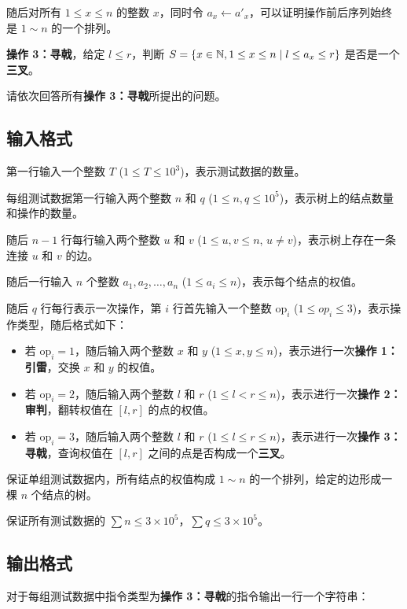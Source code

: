 随后对所有 $1 \le x \le n$ 的整数 $x$，同时令 $a_x \leftarrow a'_x$，可以证明操作前后序列始终是 $1 \sim n$ 的一个排列。

\textbf{操作 3：寻戟}，给定 $l \le r$，判断 $S=\{x \in \mathbb{N}, 1\le x \le n \mid l\le a_x\le r\}$ 是否是一个\textbf{三叉}。

请依次回答所有\textbf{操作 3：寻戟}所提出的问题。

\subsection{输入格式}

第一行输入一个整数 $T$ ($1 \le T \le 10^3$)，表示测试数据的数量。

每组测试数据第一行输入两个整数 $n$ 和 $q$ ($1 \le n, q \le 10^5$)，表示树上的结点数量和操作的数量。

随后 $n - 1$ 行每行输入两个整数 $u$ 和 $v$ ($1 \le u, v \le n$, $u \ne v$)，表示树上存在一条连接 $u$ 和 $v$ 的边。

随后一行输入 $n$ 个整数 $a_1, a_2, \ldots, a_n$ ($1 \le a_i \le n$)，表示每个结点的权值。

随后 $q$ 行每行表示一次操作，第 $i$ 行首先输入一个整数 $\text{op}_i$ ($1 \le op_i \le 3$)，表示操作类型，随后格式如下：

\begin{itemize}
	\item 若 $\text{op}_i = 1$，随后输入两个整数 $x$ 和 $y$ ($1 \le x, y \le n$)，表示进行一次\textbf{操作 1：引雷}，交换 $x$ 和 $y$ 的权值。
	\item 若 $\text{op}_i = 2$，随后输入两个整数 $l$ 和 $r$ ($1 \le l < r \le n$)，表示进行一次\textbf{操作 2：审判}，翻转权值在 $[l,r]$ 的点的权值。
	\item 若 $\text{op}_i = 3$，随后输入两个整数 $l$ 和 $r$ ($1 \le l \le r \le n$)，表示进行一次\textbf{操作 3：寻戟}，查询权值在 $[l,r]$ 之间的点是否构成一个\textbf{三叉}。
\end{itemize}

保证单组测试数据内，所有结点的权值构成 $1\sim n$ 的一个排列，给定的边形成一棵 $n$ 个结点的树。

保证所有测试数据的 $\sum n \le 3 \times 10^5$，$\sum q \le 3 \times 10^5$。

\subsection{输出格式}

对于每组测试数据中指令类型为\textbf{操作 3：寻戟}的指令输出一行一个字符串：

